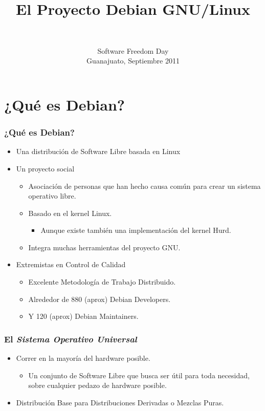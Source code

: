 \documentclass{beamer}
\title{El Proyecto Debian GNU/Linux}
\author{\authdata \\ \confurl}
\institute[S3; Debian]
{Software Developer And Debian Friend}
\date[México, 17/09/2011]{Software Freedom Day\\
  Guanajuato, Septiembre 2011}
\begin{document}
\begin{frame}
  \titlepage
\end{frame}

\section[¿Qué es Debian?]{¿Qué es Debian?}

\begin{frame}
  \frametitle {¿Qué es Debian?}
  \begin{itemize}
  \item Una distribución de Software Libre basada en Linux
  \item Un proyecto social
    \begin{itemize}
    \item Asociación de personas que han hecho causa común para crear un sistema operativo libre.
    \item Basado en el kernel Linux.
      \begin{itemize}
      \item Aunque existe también una implementación del kernel Hurd.
      \end{itemize}    
    \item Integra muchas herramientas del proyecto GNU.
    \end{itemize}
    \item Extremistas en Control de Calidad
      \begin{itemize}
      \item Excelente Metodología de Trabajo Distribuido.
      \item Alrededor de 880 (aprox) Debian Developers.
      \item Y 120 (aprox) Debian Maintainers.
      \end{itemize}
  \end{itemize}
\end{frame}

\begin{frame}
  \frametitle {El {\em Sistema Operativo Universal}}
    \begin{itemize}
    \item Correr en la mayoría del hardware posible.
      \begin{itemize}
      \item Un conjunto de Software Libre que busca ser útil para toda
      necesidad, sobre cualquier pedazo de hardware posible.
      \end{itemize}
    \item Distribución Base para Distribuciones Derivadas o Mezclas Puras.
  \end{itemize}
\end{frame}
\end{document}
